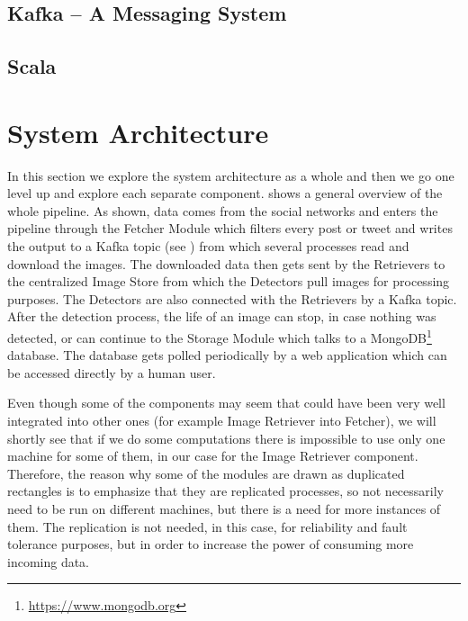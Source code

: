 \subsection{Kafka -- A Messaging System}
\label{sub-sec:kafka}


\subsection{Scala}
\label{sub-sec:scala}


\section{System Architecture}
\label{sec:sys-arch}

In this section we explore the system architecture as a whole and then we go
one level up and explore each separate component.
 shows a general overview of the whole
pipeline. As shown, data comes from the social networks and enters the
pipeline through the Fetcher Module which filters every post or tweet and
writes the output to a Kafka topic (see
) from which several processes read and
download the images. The downloaded data then gets sent by the Retrievers to
the centralized Image Store from which the Detectors pull images for
processing purposes. The Detectors are also connected with the Retrievers by a
Kafka topic. After the detection process, the life of an image can stop, in
case nothing was detected, or can continue to the Storage Module which talks
to a MongoDB\footnote{\url{https://www.mongodb.org}} database. The database
gets polled periodically by a web application which can be accessed directly by a human
user.


Even though some of the components may seem that could have been very well
integrated into other ones (for example Image Retriever into Fetcher), we will
shortly see that if we do some computations there is impossible to use only
one machine for some of them, in our case for the Image Retriever component.
Therefore, the reason why some of the modules are drawn as duplicated
rectangles is to emphasize that they are replicated processes, so not
necessarily need to be run on different machines, but there is a need for more
instances of them. The replication is not needed, in this case, for
reliability and fault tolerance purposes, but in order to increase the power
of consuming more incoming data.

